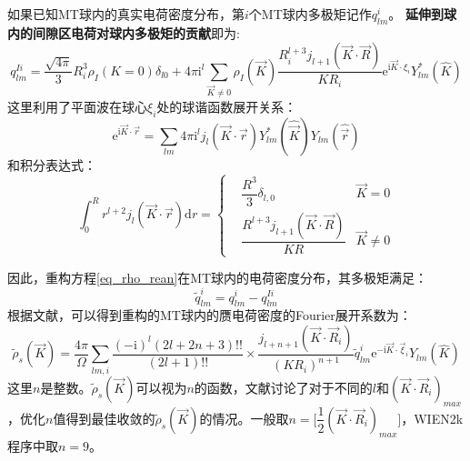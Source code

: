 如果已知\textrm{MT}球内的真实电荷密度分布，第$i$个\textrm{MT}球内多极矩记作$q_{lm}^i$。
\textbf{延伸到球内的间隙区电荷对球内多极矩的贡献}即为:
\begin{equation}
	q_{lm}^{Ii}=\dfrac{\sqrt{4\pi}}3R_i^3\rho_I(K=0)\delta_{l0}+4\pi\mathrm{i}^l\sum_{\vec K\neq 0}\rho_I(\vec K)\dfrac{R_i^{l+3}j_{l+1}(\vec K\cdot\vec R)}{KR_i}\mathrm{e}^{\mathrm{i}\vec K\cdot\xi_i}Y_{lm}^{\ast}(\hat K)
	\label{eq_multi_PW}
\end{equation}
这里利用了平面波在球心$\xi_i$处的球谐函数展开关系：
\begin{equation}
	\mathrm{e}^{\mathrm{i}\vec K\cdot \vec r}=\sum_{lm}4\pi\mathrm{i}^lj_l(\vec K\cdot\vec r)Y_{lm}^{\ast}(\hat{\vec K})Y_{lm}(\hat{\vec r})
	\label{eq_PW_Bessel}
\end{equation}
和积分表达式：
\begin{equation}
	\int_0^R r^{l+2}j_l(\vec K\cdot\vec r)\mathrm{d}r=\left\{
	\begin{aligned}
		&\dfrac{R^3}3\delta_{l,0}\quad &\vec K=0\\ 
		&\dfrac{R^{l+3}j_{l+1}(\vec K\cdot\vec R)}{KR} &\vec K\neq 0
	\end{aligned}\right.
	\label{eq_int_r_j}
\end{equation}

因此，重构方程\eqref{eq_rho_rean}在\textrm{MT}球内的电荷密度分布，其多极矩满足：
\begin{equation}
	\tilde q_{lm}^i=q_{lm}^i-q_{lm}^{Ii}
	\label{eq_psmult}
\end{equation}
根据文献，可以得到重构的\textrm{MT}球内的赝电荷密度的\textrm{Fourier}展开系数为：
\begin{equation}
	\tilde\rho_s(\vec K)=\dfrac{4\pi}{\Omega}\sum_{lm,i}\dfrac{(-\mathrm{i})^l(2l+2n+3)!!}{(2l+1)!!}\times\dfrac{j_{l+n+1}(\vec K\cdot\vec R_i)}{(KR_i)^{n+1}}\tilde q_{lm}^i\mathrm{e}^{-\mathrm{i}\vec K\cdot\vec\xi_i}Y_{lm}(\hat K)
	\label{eq_psrho}
\end{equation}
这里$n$是整数。$\tilde\rho_s(\vec K)$可以视为$n$的函数，文献讨论了对于不同的$l$和$(\vec K\cdot\vec R_i)_{max}$，优化$n$值得到最佳收敛的$\tilde\rho_s(\vec K)$的情况。一般取$n=\big[\dfrac12(\vec K\cdot\vec R_i)_{max}\big]$，\textrm{WIEN2k}程序中取$n=9$。

